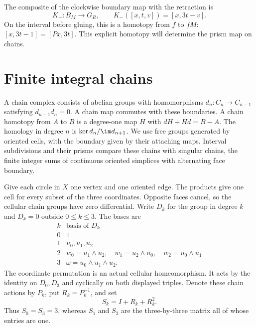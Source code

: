 The composite of the clockwise boundary map with the retraction is
\begin{equation}\label{marked-local:eq:actual-prism}
 K_-:B_M\longrightarrow G_R,
 \qquad K_-([x,t,v])=[x,3t-v].
\end{equation}
On the interval before gluing, this is a homotopy from $f$ to $fM$:
$[x,3t-1]=[Px,3t]$. This explicit homotopy will determine the
prism map on chains.

\section{Finite integral chains}

A chain complex consists of abelian groups with homomorphisms
$d_n:C_n\to C_{n-1}$ satisfying $d_{n-1}d_n=0$. A chain map
commutes with these boundaries. A chain homotopy from $A$ to $B$
is a degree-one map $H$ with $dH+Hd=B-A$.
The homology in degree $n$ is $\ker d_n/\im d_{n+1}$.
We use free groups generated by oriented cells, with the boundary
given by their attaching maps. Interval subdivisions and their prisms
compare these chains with singular chains, the finite integer sums
of continuous oriented simplices with alternating face boundary.

Give each circle in $X$ one vertex and one oriented edge. The products
give one cell for every subset of the three coordinates. Opposite
faces cancel, so the cellular chain groups have zero differential.
Write $D_k$ for the group in degree $k$ and $D_k=0$ outside $0\le k\le3$.
The bases are
\begin{equation}\label{marked-local:eq:cell-bases}
 \begin{array}{c|c}
 k&\text{basis of }D_k\\ \hline
 0&1\\
 1&u_0,u_1,u_2\\
 2&w_0=u_1\wedge u_2,
     \quad w_1=u_2\wedge u_0,
     \quad w_2=u_0\wedge u_1\\
 3&\omega=u_0\wedge u_1\wedge u_2.
 \end{array}
\end{equation}
The coordinate permutation is an actual cellular homeomorphism. It acts
by the identity on $D_0,D_3$ and cyclically on both displayed triples.
Denote these chain actions by $P_k$, put $R_k=P_k^{-1}$, and set
\begin{equation}\label{marked-local:eq:norm}
                 S_k=I+R_k+R_k^2.
\end{equation}
Thus $S_0=S_3=3$, whereas $S_1$ and $S_2$ are the three-by-three
matrix all of whose entries are one.

